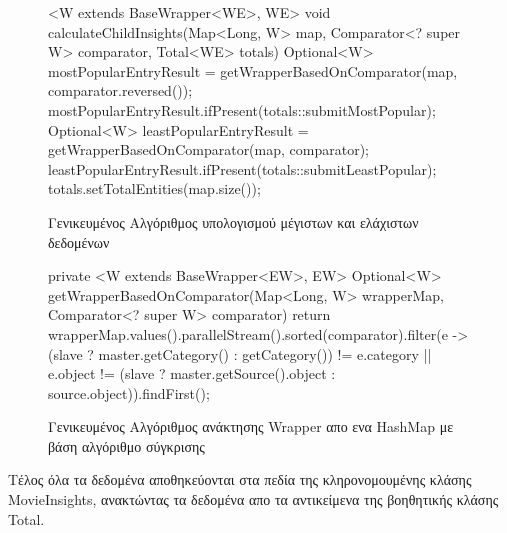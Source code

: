 \begin{figure}[h]
    \begin{javacode}
<W extends BaseWrapper<WE>, WE> void calculateChildInsights(Map<Long, W> map, Comparator<? super W> comparator, Total<WE> totals) {
    Optional<W> mostPopularEntryResult = getWrapperBasedOnComparator(map, comparator.reversed());
    mostPopularEntryResult.ifPresent(totals::submitMostPopular);
    Optional<W> leastPopularEntryResult = getWrapperBasedOnComparator(map, comparator);
    leastPopularEntryResult.ifPresent(totals::submitLeastPopular);
    totals.setTotalEntities(map.size());
}
    \end{javacode}
    \caption{Γενικευμένος Αλγόριθμος υπολογισμού μέγιστων και ελάχιστων δεδομένων}
    \label{code:calculateChildInsights}
\end{figure}
\begin{figure}[h]
    \begin{javacode}
private <W extends BaseWrapper<EW>, EW> Optional<W> getWrapperBasedOnComparator(Map<Long, W> wrapperMap, Comparator<? super W> comparator) {
    return wrapperMap.values().parallelStream().sorted(comparator).filter(e -> (slave ? master.getCategory() : getCategory()) != e.category || e.object != (slave ? master.getSource().object : source.object)).findFirst();
}
    \end{javacode}
    \caption{Γενικευμένος Αλγόριθμος ανάκτησης Wrapper απο ενα HashMap με βάση αλγόριθμο σύγκρισης}
    \label{code:getWrapperBasedOnComparator}
\end{figure}

Τέλος όλα τα δεδομένα αποθηκεύονται στα πεδία της κληρονομουμένης κλάσης MovieInsights, ανακτώντας τα δεδομένα απο τα αντικείμενα της βοηθητικής κλάσης Total.

